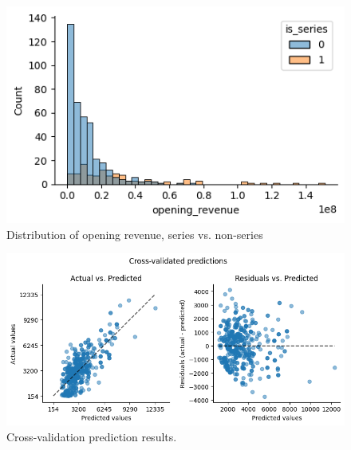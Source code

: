\documentclass[10pt]{article}
\begin{document}
\begin{figure}[H]
	\begin{center}
		\centerline{\includegraphics[scale=0.6]{is_series}}
		\caption{Distribution of opening revenue, series vs. non-series}
	\end{center}
\end{figure}

\begin{figure}[H]
	\begin{center}
		\centerline{\includegraphics[width=\columnwidth]{cross_val}}
		\caption{Cross-validation prediction results.}
	\end{center}
\end{figure}
\end{document}
